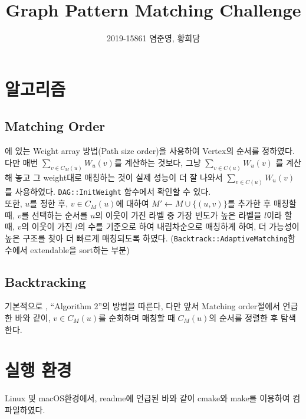 \documentclass{article}
\author{2019-15861 염준영, 황희담}
\title{Graph Pattern Matching Challenge}
\begin{document}
\maketitle
\section{알고리즘}
\subsection{Matching Order}

\cite{10.1145/3299869.3319880}에 있는 Weight array 방법(Path size order)을 사용하여 Vertex의 순서를 정하였다.
다만 매번 \(\sum_{v \in C_{M}(u)} W_{u}(v)\)를 계산하는 것보다, 그냥 \(\sum_{v \in C(u)} W_{u}(v)\) 를 계산해 놓고
그 weight대로 매칭하는 것이 실제 성능이 더 잘 나와서 \(\sum_{v \in C(u)} W_{u}(v)\)를 사용하였다.
\verb|DAG::InitWeight| 함수에서 확인할 수 있다.\\
또한, \(u\)를 정한 후, \(v \in C_{M}(u)\)에 대하여 \(M' \leftarrow M \cup \{(u, v)\}\)를 추가한 후
매칭할 때, \(v\)를 선택하는 순서를 \(u\)의 이웃이 가진 라벨 중 가장 빈도가 높은 라벨을 \(l\)이라 할 때,
\(v\)의 이웃이 가진 \(l\)의 수를 기준으로 하여 내림차순으로 매칭하게 하여, 
더 가능성이 높은 구조를 찾아 더 빠르게 매칭되도록 하였다.
(\verb|Backtrack::AdaptiveMatching|함수에서 extendable을 sort하는 부분)

\subsection{Backtracking}
기본적으로 \cite{10.1145/3299869.3319880}, ``Algorithm 2''의 방법을 따른다, 
다만 앞서 Matching order절에서 언급한 바와 같이, \(v \in C_M(u)\)를 순회하며 매칭할 때 
\(C_M(u)\)의 순서를 정렬한 후 탐색한다.


\section{실행 환경}
Linux 및 macOS환경에서, readme에 언급된 바와 같이 cmake와 make를 이용하여 컴파일하였다.
    
\printbibliography
\end{document}
